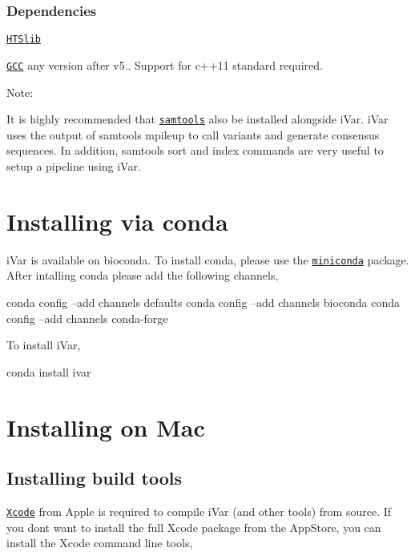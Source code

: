 \subsubsection*{Dependencies}


\begin{DoxyItemize}
\item \href{http://www.htslib.org/download/}{\tt H\+T\+Slib}
\item \href{https://gcc.gnu.org/}{\tt G\+CC} any version after v5.. Support for c++11 standard required.
\end{DoxyItemize}

Note\+:
\begin{DoxyItemize}
\item It is highly recommended that \href{https://github.com/samtools/samtools}{\tt samtools} also be installed alongside i\+Var. i\+Var uses the output of samtools mpileup to call variants and generate consensus sequences. In addition, samtools {\ttfamily sort} and {\ttfamily index} commands are very useful to setup a pipeline using i\+Var.
\end{DoxyItemize}\hypertarget{installpage_autotoc_md0}{}\section{Installing via conda}\label{installpage_autotoc_md0}
i\+Var is available on bioconda. To install conda, please use the \href{https://conda.io/miniconda.html}{\tt miniconda} package. After intalling conda please add the following channels,


\begin{DoxyCode}
conda config --add channels defaults
conda config --add channels bioconda
conda config --add channels conda-forge
\end{DoxyCode}


To install i\+Var,


\begin{DoxyCode}
conda install ivar
\end{DoxyCode}
\hypertarget{installpage_autotoc_md1}{}\section{Installing on Mac}\label{installpage_autotoc_md1}
\hypertarget{installpage_autotoc_md2}{}\subsection{Installing build tools}\label{installpage_autotoc_md2}
\href{https://developer.apple.com/xcode/}{\tt Xcode} from Apple is required to compile i\+Var (and other tools) from source. If you don\textquotesingle{}t want to install the full Xcode package from the App\+Store, you can install the Xcode command line tools,


